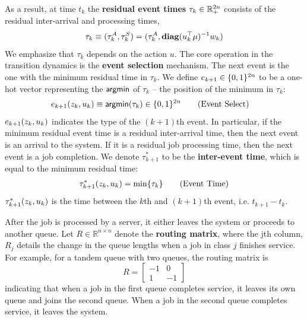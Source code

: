 As a result, at time $t_{k}$ the {\bf residual event times} $\tau_{k} \in \mathbb{R}_{+}^{2n}$ consists of the residual inter-arrival and processing times,
\[
\tau_{k} \equiv (\tau_{k}^{A}, \tau_{k}^{S}) = (\tau_{k}^{A}, \mathbf{diag}(u_{k}^\top \mu)^{-1} w_{k} )
\]
We emphasize that $\tau_{k}$ depends on the action $u$. The core operation in the transition dynamics is the {\bf event selection} mechanism. The next event is the one with the minimum residual time in $\tau_{k}$.
We define $e_{k+1} \in \{0,1\}^{2n}$ to be a one-hot vector representing the $\mathop{\mathsf{argmin}}$ of $\tau_{k}$ -- the position of the minimum in $\tau_{k}$:
\begin{align*}
e_{k+1}(z_{k}, u_{k}) &\equiv \mathop{\mathsf{argmin}} (\tau_{k})  \in \{0,1\}^{2n}\tag{Event Select}
\end{align*}
$e_{k+1}(z_{k}, u_{k})$ indicates the type of the $(k+1)$th event.
In particular, if the minimum residual event time is a residual inter-arrival time, then the next event is an arrival to the system. If it is a residual job processing time, then the next event is a job completion.
We denote $\tau^{*}_{k+1}$ to be the {\bf inter-event time}, which is equal to the minimum residual time:
\begin{align}
\tau^{*}_{k+1}(z_{k}, u_{k}) 
= \min \{ \tau_{k} \}
\tag{Event Time}
\end{align}
$\tau^{*}_{k+1}(z_{k}, u_{k})$ is the time between the $k$th and $(k+1)$th event, i.e. $t_{k+1} - t_{k}$.

After the job is processed by a server, it either leaves the system or proceeds
to another queue. Let $R\in\mathbb{R}^{n\times n}$ denote the {\bf routing matrix}, where the jth column, $R_{j}$ details the change in the queue lengths when a job in class $j$ finishes service. For example, for a tandem queue with two queues, the routing
matrix is
\[
R=\left[\begin{array}{cc}
-1 & 0\\
1 & -1
\end{array}\right]
\]
indicating that when a job in the first queue completes service, it leaves its
own queue and joins the second queue. When a job in the second queue
completes service, it leaves the system. 

